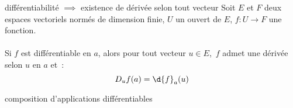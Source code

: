 \begin{theoreme}{19.9}{différentiabilité $\implies$ existence de dérivée selon tout vecteur}
    Soit $E$ et $F$ deux espaces vectoriels normés de dimension finie, $U$ un ouvert de $E$, $f:U\to F$ une fonction.\\\\
    Si $f$ est différentiable en $a$, alors pour tout vecteur $u \in E$,\, $f$ admet une dérivée selon $u$ en $a$ et~:
    $$D_uf(a) = \d{f}_a(u)$$
\end{theoreme}

\begin{theoreme}{19.18}{composition d'applications différentiables}
    
\end{theoreme}



